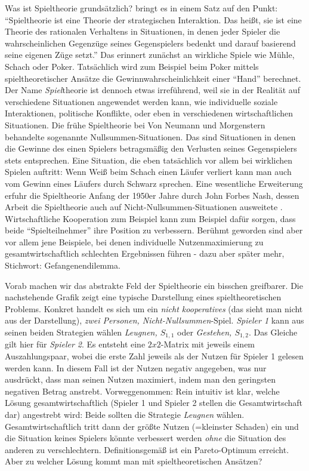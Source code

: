 Was ist Spieltheorie grundsätzlich? \textcite[S. 136]{Harsanyi1994} bringt es in einem Satz auf den Punkt: "`Spieltheorie ist eine Theorie der strategischen Interaktion. Das heißt, sie ist eine Theorie des rationalen Verhaltens in Situationen, in denen jeder Spieler die wahrscheinlichen Gegenzüge seines Gegenspielers bedenkt und darauf basierend seine eigenen Züge setzt."' Das erinnert zunächst an wirkliche Spiele wie Mühle, Schach oder Poker. Tatsächlich wird zum Beispiel beim Poker mittels spieltheoretischer Ansätze die Gewinnwahrscheinlichkeit einer "`Hand"' berechnet. Der Name \textit{Spiel}theorie ist dennoch etwas irreführend, weil sie in der Realität auf verschiedene Situationen angewendet werden kann, wie individuelle soziale Interaktionen, politische Konflikte, oder eben in verschiedenen wirtschaftlichen Situationen. Die frühe Spieltheorie bei Von Neumann und Morgenstern behandelte sogenannte Nullsummen-Situationen. Das sind Situationen in denen die Gewinne des einen Spielers betragsmäßig den Verlusten seines Gegenspielers stets entsprechen. Eine Situation, die eben tatsächlich vor allem bei wirklichen Spielen auftritt: Wenn Weiß beim Schach einen Läufer verliert kann man auch vom Gewinn eines Läufers durch Schwarz sprechen. Eine wesentliche Erweiterung erfuhr die Spieltheorie Anfang der 1950er Jahre durch John Forbes Nash, dessen Arbeit die Spieltheorie auch auf Nicht-Nullsummen-Situationen ausweitete \parencite[S. 163]{Nash1994}. Wirtschaftliche Kooperation zum Beispiel kann zum Beispiel dafür sorgen, dass beide "`Spielteilnehmer"' ihre Position zu verbessern. Berühmt geworden sind aber vor allem jene Beispiele, bei denen individuelle Nutzenmaximierung zu gesamtwirtschaftlich schlechten Ergebnissen führen - dazu aber später mehr, Stichwort: Gefangenendilemma.

Vorab machen wir das abstrakte Feld der Spieltheorie ein bisschen greifbarer. Die nachstehende Grafik zeigt eine typische Darstellung eines spieltheoretischen Problems. Konkret handelt es sich um ein \textit{nicht kooperatives} (das sieht man nicht aus der Darstellung), \textit{zwei Personen, Nicht-Nullsummen}-Spiel. \textit{Spieler 1} kann aus seinen beiden Strategien wählen \textit{Leugnen, $S_{1,1}$} oder \textit{Gestehen, $S_{1,2}$}. Das Gleiche gilt hier für \textit{Spieler 2}. Es entsteht eine $2x2$-Matrix mit jeweils einem Auszahlungspaar, wobei die erste Zahl jeweils als der Nutzen für Spieler 1 gelesen werden kann. In diesem Fall ist der Nutzen negativ angegeben, was nur ausdrückt, dass man seinen Nutzen maximiert, indem man den geringsten negativen Betrag anstrebt. Vorweggenommen: Rein intuitiv ist klar, welche Lösung gesamtwirtschaftlich (Spieler 1 und Spieler 2 stellen die Gesamtwirtschaft dar) angestrebt wird: Beide sollten die Strategie \textit{Leugnen} wählen. Gesamtwirtschaftlich tritt dann der größte Nutzen (=kleinster Schaden) ein und die Situation keines Spielers könnte verbessert werden \textit{ohne} die Situation des anderen zu verschlechtern. Definitionsgemäß ist ein Pareto-Optimum erreicht. Aber zu welcher Lösung kommt man mit spieltheoretischen Ansätzen?


